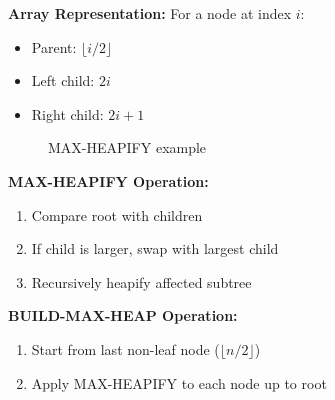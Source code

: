 \textbf{Array Representation:}
For a node at index $i$:
\begin{itemize}
    \item Parent: $\lfloor i/2 \rfloor$
    \item Left child: $2i$
    \item Right child: $2i + 1$
\end{itemize}

\begin{figure}[H]
    \centering
    \caption*{MAX-HEAPIFY example}
\end{figure}

\textbf{MAX-HEAPIFY Operation:}
\begin{enumerate}
    \item Compare root with children
    \item If child is larger, swap with largest child
    \item Recursively heapify affected subtree
\end{enumerate}

\textbf{BUILD-MAX-HEAP Operation:}
\begin{enumerate}
    \item Start from last non-leaf node ($\lfloor n/2 \rfloor$)
    \item Apply MAX-HEAPIFY to each node up to root
\end{enumerate}

